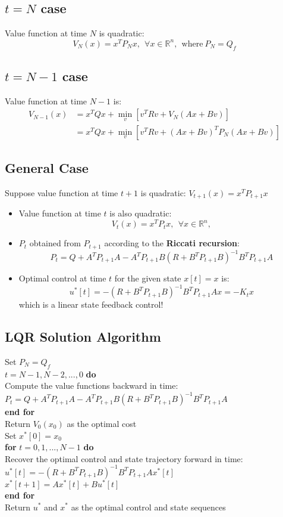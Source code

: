 \documentclass[10pt,a4paper,oneside]{article}
\begin{document}
\subsection{$t=N$ case}
Value function at time $N$ is quadratic:
\[
V_N(x)=x^TP_Nx,\ \ \forall x\in \mathbb{R}^n,\ \ \text{where} \ P_N=Q_f
\]
\subsection{$t=N-1$ case}
Value function at time $N-1$ is:
$$
\begin{aligned}
V_{N-1}(x)&=x^TQx+\min_{v}[v^TRv+V_{N}(Ax+Bv)]\\&=x^TQx+\min_{v}[v^TRv+(Ax+Bv)^TP_N(Ax+Bv)]
\end{aligned}
$$
\subsection{General Case}
Suppose value function at time $t+1$ is quadratic: $V_{t+1}(x)=x^TP_{t+1}x$
\begin{itemize}
\item Value function at time $t$ is also quadratic:
\[
V_t(x)=x^TP_tx,\ \  \forall x\in \mathbb{R}^n,
\]
\item $P_t$ obtained from $P_{t+1}$ according to the {\bfseries Riccati recursion}:
\[
P_t=Q+A^TP_{t+1}A - A^TP_{t+1}B(R+B^TP_{t+1}B)^{-1}B^TP_{t+1}A
\]
\item Optimal control at time $t$ for the given state $x[t]=x$ is:
\[
u^*[t] = -(R+B^TP_{t+1}B)^{-1}B^TP_{t+1}Ax=-K_tx
\]
which is a linear state feedback control!
\end{itemize}
\subsection{LQR Solution Algorithm}
\begin{framed}
\noindent Set $P_N=Q_f$\\
 $t=N-1,N-2,...,0$ {\bfseries do}\\
\indent Compute the value functions backward in time:\\
\indent $P_t=Q+A^TP_{t+1}A - A^TP_{t+1}B(R+B^TP_{t+1}B)^{-1}B^TP_{t+1}A$\\
{\bfseries end for}\\
Return $V_0(x_0)$ as the optimal cost\\
Set $x^*[0]=x_0$\\
{\bfseries for} $t=0,1,...,N-1$ {\bfseries do}\\
\indent Recover the optimal control and state trajectory forward in time:\\
\indent $u^*[t]=-(R+B^TP_{t+1}B)^{-1}B^TP_{t+1}Ax^*[t]$\\
\indent $x^*[t+1]=Ax^*[t]+Bu^*[t]$\\
{\bfseries end for}\\
Return $u^*$ and $x^*$ as the optimal control and state sequences
\end{framed}
\end{document}

